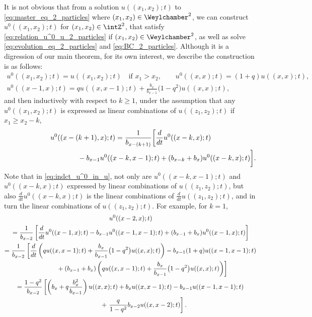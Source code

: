 \begin{Remark} \label{rmk:inverse_2pt}
 It is not obvious that from a solution $u((x_1, x_2); t)$ to \eqref{eq:master_eq_2_particles} where $(x_1, x_2) \in \Weylchamber^2$, we can construct $u^0((x_1, x_2); t)$ for $(x_1, x_2) \in \intZ^2$, that satisfy \eqref{eq:relation_u^0_u_2_particles} if $(x_1, x_2) \in \Weylchamber^2$, as well as solve \eqref{eq:evolution_eq_2_particles} and \eqref{eq:BC_2_particles}. Although it is a digression of our main theorem, for its own interest, we describe the construction is as follows:
\begin{gather*}
 u^0((x_1, x_2); t) = u((x_1, x_2); t) \quad \text{if $x_1 > x_2$}, \qquad u^0((x, x); t) = (1 + q) u((x, x); t), \\
 u^0((x - 1, x); t) = q u((x, x - 1); t) + \frac{b_x}{b_{x - 1}} \big(1 - q^2\big) u((x, x); t),
\end{gather*}
and then inductively with respect to $k \geq 1$, under the assumption that any $u^0((x_1, x_2); t)$ is expressed as linear combinations of $u((z_1, z_2); t)$ if $x_1 \geq x_2 - k$,
\begin{gather}
 u^0((x - (k + 1), x); t) =
 \frac{1}{b_{x - (k + 1)}} \bigg[ \frac{d}{dt} u^0((x - k, x); t) \nonumber\\
 \hphantom{u^0((x - (k + 1), x); t) = }{} - b_{x - 1} u^0((x - k, x - 1); t) + (b_{x - k} + b_x) u^0((x - k, x); t) \bigg].\label{eq:indct_u^0_in_u}
\end{gather}
Note that in \eqref{eq:indct_u^0_in_u}, not only are $u^0((x - k, x - 1); t)$ and $u^0((x - k, x); t)$ expressed by linear combinations of $u((z_1, z_2); t)$, but also $\frac{d}{dt} u^0((x - k, x); t)$ is the linear combinations of $\frac{d}{dt} u((z_1, z_2); t)$, and in turn the linear combinations of $u((z_1, z_2); t)$. For example, for $k = 1$,
\begin{gather*}
   u^0((x - 2, x); t) \\
 =   \frac{1}{b_{x - 2}} \left[ \frac{d}{dt} u^0((x - 1, x); t) - b_{x - 1} u^0((x - 1, x - 1); t) + (b_{x - 1} + b_x) u^0((x - 1, x); t) \right] \\
 =   \frac{1}{b_{x - 2}} \left[ \frac{d}{dt} \left( q u((x, x - 1); t) + \frac{b_x}{b_{x - 1}} \big(1 - q^2\big) u((x, x); t) \right) - b_{x - 1} (1 + q) u((x - 1, x - 1); t) \right. \\
  \hphantom{=\frac{1}{b_{x - 2}}} \left. \vphantom{\frac{d}{dt}} + (b_{x - 1} + b_x) \left( q u((x, x - 1); t) + \frac{b_x}{b_{x - 1}} \big(1 - q^2\big) u((x, x); t) \right) \right] \\
 =   \frac{1 - q^2}{b_{x - 2}} \left[ \left( b_x + q \frac{b^2_x}{b_{x - 1}} \right) u((x, x); t) + b_x u((x, x - 1); t) - b_{x - 1} u((x - 1, x - 1); t) \right. \\
  \hphantom{=\frac{1 - q^2}{b_{x - 2}}} + \left. \frac{q}{1 - q^2} b_{x - 2} u((x, x - 2); t) \right].
\end{gather*}
\end{Remark}

